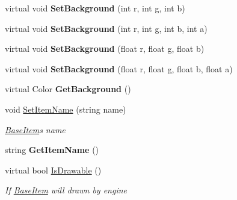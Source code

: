 \begin{DoxyCompactItemize}
\mbox{\label{class_space_v_i_l_1_1_base_item_a9f76dd4ad8d980111b39a84329348706}} 
virtual void {\bfseries Set\+Background} (int r, int g, int b)
\item 
\mbox{\label{class_space_v_i_l_1_1_base_item_a9d750bcf2254f44623cf1697ebbd9ca8}} 
virtual void {\bfseries Set\+Background} (int r, int g, int b, int a)
\item 
\mbox{\label{class_space_v_i_l_1_1_base_item_a6134cdb21d533ac5186e4acd30fe465c}} 
virtual void {\bfseries Set\+Background} (float r, float g, float b)
\item 
\mbox{\label{class_space_v_i_l_1_1_base_item_a2b47d3fe8c356d1756bbff999d476e07}} 
virtual void {\bfseries Set\+Background} (float r, float g, float b, float a)
\item 
\mbox{\label{class_space_v_i_l_1_1_base_item_ab6a7649082ecc3da16b450dad6360c1d}} 
virtual Color {\bfseries Get\+Background} ()
\item 
void \mbox{\hyperlink{class_space_v_i_l_1_1_base_item_a10bc09b650b0e0ed08536b402beb6813}{Set\+Item\+Name}} (string name)
\begin{DoxyCompactList}\small\item\em \mbox{\hyperlink{class_space_v_i_l_1_1_base_item}{Base\+Item}}\textquotesingle{}s name \end{DoxyCompactList}\item 
\mbox{\label{class_space_v_i_l_1_1_base_item_a70fc344d02591cf519cd36e278e6f95f}} 
string {\bfseries Get\+Item\+Name} ()
\item 
virtual bool \mbox{\hyperlink{class_space_v_i_l_1_1_base_item_a002a247f3745be1e1e57c504589d7036}{Is\+Drawable}} ()
\begin{DoxyCompactList}\small\item\em If \mbox{\hyperlink{class_space_v_i_l_1_1_base_item}{Base\+Item}} will drawn by engine \end{DoxyCompactList}\item 
\mbox{\label{class_space_v_i_l_1_1_base_item_a7dfcfb7cb25bf50d10941e59e919d3f8}} 

\end{DoxyCompactItemize}
